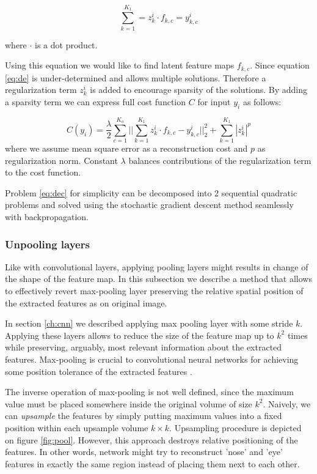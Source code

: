 \begin{equation}\label{eq:de}
  \sum^{K_1}_{k=1}=z^i_k \cdot f_{k,c} = y^i_{k,c}
\end{equation}

where $\cdot$ is a dot product.

Using this equation we would like to find latent feature maps $f_{k,c}$.
Since equation \ref{eq:de} is under-determined and allows multiple solutions.
Therefore a regularization term $z^i_k$ is added to encourage sparsity of the solutions.
By adding a sparsity term we can express full cost function $C$ for input $y_i$ as follows:

\begin{equation}\label{eq:dec}
    C(y_i) = \frac{\lambda}{2} \sum^{K_o}_{c=1} ||\sum^{K_1}_{k=1}{z^i_k \cdot f_{k,c} - y^i_{k,c}}||^2_2 + \sum^{K_1}_{k=1}{|z^i_k|^p}
\end{equation}
where we assume mean square error as a reconstruction cost and $p$ as regularization norm.
Constant $\lambda$ balances contributions of the regularization term to the cost function.

Problem \ref{eq:dec} for simplicity can be decomposed into 2 sequential quadratic problems and solved using the stochastic gradient descent method seamlessly with backpropagation.

\subsubsection{Unpooling layers}\label{ch:unp}

Like with convolutional layers, applying pooling layers might results in change of the shape of the feature map.
In this subsection we describe a method that allows to effectively revert max-pooling layer preserving the relative spatial position of the extracted features as on original image.

In section \ref{ch:cnn} we described applying max pooling layer with some stride $k$.
Applying these layers allows to reduce the size of the feature map up to $k^2$ times while preserving, arguably, most relevant information about the extracted features.
Max-pooling is crucial to convolutional neural networks for achieving some position tolerance of the extracted features \cite{Jaderberg2015}.

The inverse operation of max-pooling is not well defined, since the maximum value must be placed somewhere inside the original volume of size $k^2$. Naively, we can \textit{upsample} the features by simply putting maximum values into a fixed position within each upsample volume $k \times k$.
Upsampling procedure is depicted on figure \ref{fig:pool}.
However, this approach destroys relative positioning of the features.
In other words, network might try to reconstruct 'nose' and 'eye' features in exactly the same region instead of placing them next to each other.

